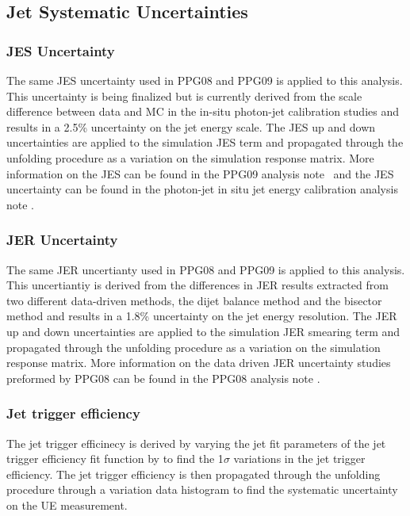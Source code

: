 \subsection{Jet Systematic Uncertainties}

\subsubsection{JES Uncertainty}
The same JES uncertainty used in PPG08 and PPG09 \cite{ppg08AN,ppg09AN} is applied to this analysis. 
This uncertainty is being finalized but is currently derived from the scale difference between data and MC in the in-situ photon-jet calibration studies and results in a 2.5\% uncertainty on the jet energy scale. 
The JES up and down uncertainties are applied to the simulation JES term and propagated through the unfolding procedure as a variation on the simulation response matrix.
More information on the JES can be found in the PPG09 analysis note~\cite{ppg09AN} and the JES uncertainty can be found in the photon-jet in situ jet energy calibration analysis note \cite{in_situ_note}.

\subsubsection{JER Uncertainty}
The same JER uncertianty used in PPG08 and PPG09 \cite{ppg08AN,ppg09AN} is applied to this analysis. 
This uncertiantiy is derived from the differences in JER results extracted from two different data-driven methods, the dijet balance method and the bisector method and results in a 1.8\% uncertainty on the jet energy resolution.
The JER up and down uncertainties are applied to the simulation JER smearing term and propagated through the unfolding procedure as a variation on the simulation response matrix.
More information on the data driven JER uncertainty studies preformed by PPG08 can be found in the PPG08 analysis note \cite{ppg08AN}.

\subsubsection{Jet trigger efficiency}
The jet trigger efficinecy is derived by varying the jet fit parameters of the jet trigger efficiency fit function by to find the 1$\sigma$ variations in the jet trigger efficiency.
The jet trigger efficiency is then propagated through the unfolding procedure through a variation data histogram to find the systematic uncertainty on the UE measurement.

